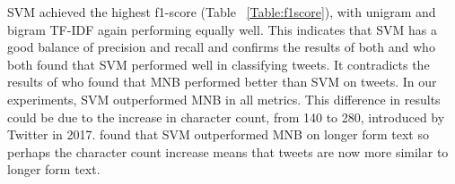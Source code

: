 SVM achieved the highest f1-score (Table ~\ref{Table:f1score}), with unigram and bigram TF-IDF again performing equally well. This indicates that SVM has a good balance of precision and recall and confirms the results of both \cite{Raithi2018} and \cite{Rane2018} who both found that SVM performed well in classifying tweets. It contradicts the results of \cite{Berm2010} who found that MNB performed better than SVM on tweets. In our experiments, SVM outperformed MNB in all metrics. This difference in results could be due to the increase in character count, from 140 to 280, introduced by Twitter in 2017. \cite{Berm2010} found that SVM outperformed MNB on longer form text so perhaps the character count increase means that tweets are now more similar to longer form text.

\begin{table}[h!]
\setlength{\tabcolsep}{3pt}
\caption{Accuracy of Classifiers and Feature Representations.}
\label{Table:accuracy}
\end{table}
